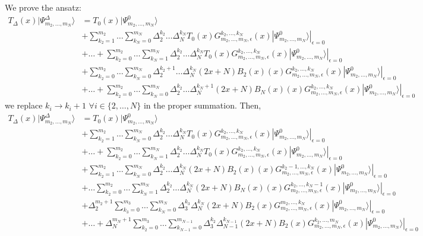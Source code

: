 \documentclass[11pt]{article}
\numberwithin{equation}{subsection}
\begin{document}
We prove the ansatz:
\begin{align*}
	T_{\Delta}(x)|\Psi_{m_{2},\ldots,m_{N}}^{\Delta}\rangle&=T_{0}(x)|\Psi_{m_{2},\ldots,m_{N}}^{0}\rangle
	\\&+
	\sum_{k_{2}=1}^{m_{2}}\ldots\sum_{k_{N}=0}^{m_{N}}\Delta_{2}^{k_{2}}\ldots \Delta_{N}^{k_{N}}T_{0}(x)G_{m_{2},\ldots,m_{N},\epsilon}^{k_{2},\ldots,k_{N}}(x)|\Psi_{m_{2},\ldots,m_{N}}^{0}\rangle|_{\epsilon=0}
	\\&+\ldots+	\sum_{k_{2}=0}^{m_{2}}\ldots\sum_{k_{N}=1}^{m_{N}}\Delta_{2}^{k_{2}}\ldots \Delta_{N}^{k_{N}}T_{0}(x)G_{m_{2},\ldots,m_{N},\epsilon}^{k_{2},\ldots,k_{N}}(x)|\Psi_{m_{2},\ldots,m_{N}}^{0}\rangle|_{\epsilon=0} 
	\\&+\sum_{k_{2}=0}^{m_{2}}\ldots\sum_{k_{N}=0}^{m_{N}}\Delta_{2}^{k_{2}+1}\ldots \Delta_{N}^{k_{N}}(2x+N)B_{2}(x)(x)G_{m_{2},\ldots,m_{N},\epsilon}^{k_{2},\ldots,k_{N}}(x)|\Psi_{m_{2},\ldots,m_{N}}^{0}\rangle|_{\epsilon=0}
	\\&+\ldots +
	\sum_{k_{2}=0}^{m_{2}}\ldots\sum_{k_{N}=0}^{m_{N}}\Delta_{2}^{k_{2}}\ldots \Delta_{N}^{k_{N}+1}(2x+N)B_{N}(x)(x)G_{m_{2},\ldots,m_{N},\epsilon}^{k_{2},\ldots,k_{N}}(x)|\Psi_{m_{2},\ldots,m_{N}}^{0}\rangle|_{\epsilon=0}
\end{align*}
we replace $k_{i}\to k_{i}+1$ $\forall i\in\{2,\ldots,N\}$ in the proper summation. Then,
\begin{align*}
	T_{\Delta}(x)|\Psi_{m_{2},\ldots,m_{N}}^{\Delta}\rangle&=T_{0}(x)|\Psi_{m_{2},\ldots,m_{N}}^{0}\rangle
	\\&+
	\sum_{k_{2}=1}^{m_{2}}\ldots\sum_{k_{N}=0}^{m_{N}}\Delta_{2}^{k_{2}}\ldots \Delta_{N}^{k_{N}}T_{0}(x)G_{m_{2},\ldots,m_{N},\epsilon}^{k_{2},\ldots,k_{N}}(x)|\Psi_{m_{2},\ldots,m_{N}}^{0}\rangle|_{\epsilon=0}
	\\&+\ldots+	\sum_{k_{2}=0}^{m_{2}}\ldots\sum_{k_{N}=1}^{m_{N}}\Delta_{2}^{k_{2}}\ldots \Delta_{N}^{k_{N}}T_{0}(x)G_{m_{2},\ldots,m_{N},\epsilon}^{k_{2},\ldots,k_{N}}(x)|\Psi_{m_{2},\ldots,m_{N}}^{0}\rangle|_{\epsilon=0}
	\\&+\sum_{k_{2}=1}^{m_{2}}\ldots\sum_{k_{N}=0}^{m_{N}}\Delta_{2}^{k_{2}}\ldots \Delta_{N}^{k_{N}}(2x+N)B_{2}(x)(x)G_{m_{2},\ldots,m_{N},\epsilon}^{k_{2}-1,\ldots,k_{N}}(x)|\Psi_{m_{2},\ldots,m_{N}}^{0}\rangle|_{\epsilon=0}
	\\&+\ldots
	\sum_{k_{2}=0}^{m_{2}}\ldots\sum_{k_{N}=1}^{m_{N}}\Delta_{2}^{k_{2}}\ldots \Delta_{N}^{k_{N}}(2x+N)B_{N}(x)(x)G_{m_{2},\ldots,m_{N},\epsilon}^{k_{2},\ldots,k_{N}-1}(x)|\Psi_{m_{2},\ldots,m_{N}}^{0}\rangle|_{\epsilon=0}
	\\&+
	\Delta_{2}^{m_{2}+1}\sum_{k_{3}=0}^{m_{3}}\ldots\sum_{k_{N}=0}^{m_{N}}\Delta_{3}^{k_{3}}\Delta_{N}^{k_{N}}(2x+N)B_{2}(x)G_{m_{2},\ldots,m_{N},\epsilon}^{m_{2},\ldots,k_{N}}(x)|\Psi_{m_{2},\ldots,m_{N}}^{0}\rangle|_{\epsilon=0}
	\\&+\ldots +
	\Delta_{N}^{m_{N}+1}\sum_{k_{2}=0}^{m_{3}}\ldots\sum_{k_{N-1}=0}^{m_{N-1}}\Delta_{3}^{k_{2}}\Delta_{N-1}^{k_{N-1}}(2x+N)B_{2}(x)G_{m_{2},\ldots,m_{N},\epsilon}^{k_{2},\ldots,m_{N}}(x)|\Psi_{m_{2},\ldots,m_{N}}^{0}\rangle|_{\epsilon=0}
\end{align*}
\end{document}
